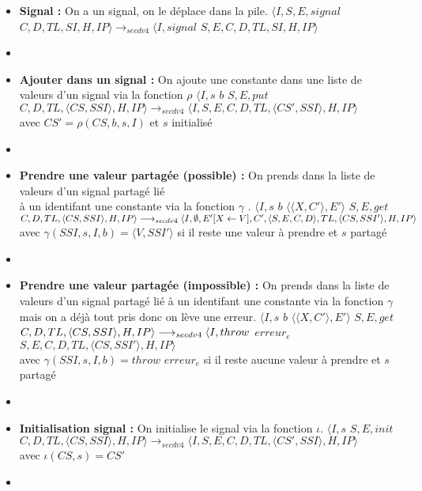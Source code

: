 \documentclass[10pt,a4paper]{article}
\begin{document}
\begin{enumerate}
\begin{itemize}
	   					\item[]  \textbf{Signal :} On a un signal, on le déplace dans la pile.
						\smallbreak 
						$\langle I,S,E,signal$ $C,D,TL,SI,H,IP\rangle
						\longrightarrow_{secdv4} \langle I,signal$ $S,E,C,D,TL,SI,H,IP\rangle$
						\item[]
							
						\item[] \textbf{Ajouter dans un signal :} On ajoute une constante dans une liste de valeurs d'un signal via la fonction $\rho$
						\smallbreak
						$\langle I,s$ $b$ $S,E,put$ $C,D,TL,\langle CS,SSI\rangle,H,IP\rangle \longrightarrow_{secdv4} \langle I,S,E,C,D,TL,\langle CS',SSI\rangle,H,IP\rangle$ \\
						avec $CS' = \rho(CS,b,s,I)$ et $s$ initialisé
						\item[]
							
						\item[] \textbf{Prendre une valeur partagée (possible) :} On prends dans la liste de valeurs d'un signal partagé lié \\
						à un identifant une constante via la fonction $\gamma$ .
						\smallbreak
						$\langle I,s$ $b$ $\langle\langle X,C'\rangle,E'\rangle$ $S,E,get$ $C,D,TL,\langle CS,SSI\rangle,H,IP\rangle 
						\\\longrightarrow_{secdv4} \langle I,\emptyset,E'[X \leftarrow V],C',\langle S,E,C,D\rangle,TL,\langle CS,SSI'\rangle,H,IP\rangle$\\
						avec $ \gamma(SSI,s,I,b) = \langle V,SSI'\rangle$ si il reste une valeur à prendre et $s$ partagé
						\item[]
							
						\item[] \textbf{Prendre une valeur partagée (impossible) :} On prends dans la liste de valeurs d'un signal partagé lié à un identifant une constante via la fonction $\gamma$ mais on a déjà tout pris donc on lève une erreur.
						\smallbreak 
						$\langle I,s$ $b$ $\langle\langle X,C'\rangle,E'\rangle$ $S,E,get$ $C,D,TL,\langle CS,SSI\rangle,H,IP\rangle 
						\\\longrightarrow_{secdv4} \langle I,throw$ $erreur_{e}$ $S,E,C,D,TL,\langle CS,SSI'\rangle,H,IP\rangle$\\
						avec $ \gamma(SSI,s,I,b) = throw$ $erreur_{e}$ si il reste aucune valeur à prendre et $s$ partagé
						\item[]
							
						\item[] \textbf{Initialisation signal :} On initialise le signal via la fonction $\iota$.
						\smallbreak 
						$\langle I,s$ $S,E,init$ $C,D,TL,\langle CS,SSI\rangle,H,IP\rangle 
						\longrightarrow_{secdv4} \langle I,S,E,C,D,TL,\langle CS',SSI\rangle,H,IP\rangle$\\
						avec $\iota(CS,s) = CS'$
						\item[]	
							

\end{itemize}
\end{enumerate}
\end{document}
